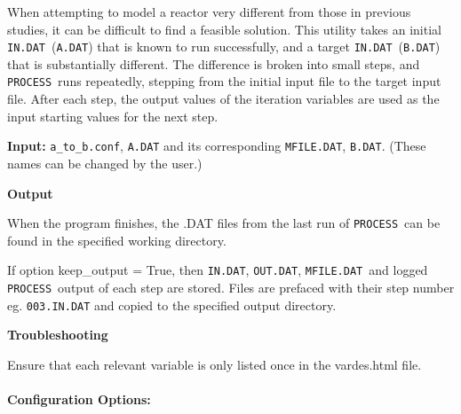 \documentclass[11pt,a4paper]{article}
\newcommand{\indat}{\mbox{\texttt{IN.DAT}}}
\newcommand{\mfile}{\mbox{\texttt{MFILE.DAT}}}
\newcommand{\outdat}{\mbox{\texttt{OUT.DAT}}}
\newcommand{\process}{\mbox{\texttt{PROCESS}}}
\begin{document}
When attempting to model a reactor very different from those in previous studies, it can be difficult to find a feasible solution.  This utility takes an initial \indat\ (\texttt{A.DAT}) that is known to run successfully, and a target \indat\ (\texttt{B.DAT}) that is substantially different.  The difference is broken into small steps, and \process\ runs repeatedly, stepping from the initial input file to the target input file.  After each step, the output values of the iteration variables are used as the input starting values for the next step.

\begin{description}
\item{\textbf{Input:}}
\texttt{a\_to\_b.conf}, \texttt{A.DAT} and its corresponding \texttt{MFILE.DAT}, \texttt{B.DAT}.
(These names can be changed by the user.)

\item{\textbf{Output}}

When the program finishes, the .DAT files from the last run of \process\ can
be found in the specified working directory.

If option keep\_output = True, then \indat, \outdat, \mfile\ and logged \process\
output of each step are stored. Files are prefaced with their step number
eg. \texttt{003.IN.DAT} and copied to the specified output directory.

\item{\textbf{Troubleshooting}}

Ensure that each relevant variable is only listed once in the vardes.html file.

\end{description}

\paragraph{Configuration Options:}
\end{document}

